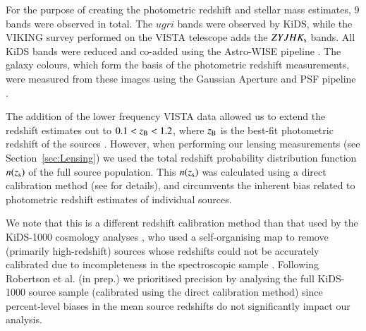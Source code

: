 \documentclass{aa}
\newcommand{\un}[1]{_{\rm #1}}
\begin{document}
For the purpose of creating the photometric redshift and stellar mass estimates, 9 bands were observed in total. The $ugri$ bands were observed by KiDS, while the VIKING survey \cite[]{edge2013} performed on the VISTA telescope adds the $ZYJHK\un{s}$ bands. All KiDS bands were reduced and co-added using the Astro-WISE pipeline \cite[AW;][]{mcfarland2013}. The galaxy colours, which form the basis of the photometric redshift measurements, were measured from these images using the Gaussian Aperture and PSF pipeline \cite[\textsc{GAaP};][]{kuijken2008,kuijken2015}.

The addition of the lower frequency VISTA data allowed us to extend the redshift estimates out to $0.1<z\un{B}<1.2$, where $z\un{B}$ is the best-fit photometric redshift of the sources \cite[]{benitez2000,hildebrandt2012}. However, when performing our lensing measurements (see Section~\ref{sec:Lensing}) we used the total redshift probability distribution function $n(z\un{s})$ of the full source population. This $n(z\un{s})$ was calculated using a direct calibration method (see \citealp{hildebrandt2017} for details), and circumvents the inherent bias related to photometric redshift estimates of individual sources.

We note that this is a different redshift calibration method than that used by the KiDS-1000 cosmology analyses \citep{asgari2020,heymans2020,troster2020}, who used a self-organising map to remove (primarily high-redshift) sources whose redshifts could not be accurately calibrated due to incompleteness in the spectroscopic sample \citep{wright2020,hildebrandt2020}. Following Robertson et al. (in prep.) we prioritised precision by analysing the full KiDS-1000 source sample (calibrated using the direct calibration method) since percent-level biases in the mean source redshifts do not significantly impact our analysis.
\end{document}

